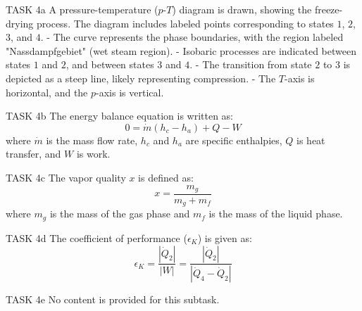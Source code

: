 TASK 4a  
A pressure-temperature (\(p\)-\(T\)) diagram is drawn, showing the freeze-drying process. The diagram includes labeled points corresponding to states \(1\), \(2\), \(3\), and \(4\).  
- The curve represents the phase boundaries, with the region labeled "Nassdampfgebiet" (wet steam region).  
- Isobaric processes are indicated between states \(1\) and \(2\), and between states \(3\) and \(4\).  
- The transition from state \(2\) to \(3\) is depicted as a steep line, likely representing compression.  
- The \(T\)-axis is horizontal, and the \(p\)-axis is vertical.  

TASK 4b  
The energy balance equation is written as:  
\[
0 = \dot{m} (h_c - h_a) + Q - W
\]  
where \( \dot{m} \) is the mass flow rate, \( h_c \) and \( h_a \) are specific enthalpies, \( Q \) is heat transfer, and \( W \) is work.  

TASK 4c  
The vapor quality \(x\) is defined as:  
\[
x = \frac{m_g}{m_g + m_f}
\]  
where \( m_g \) is the mass of the gas phase and \( m_f \) is the mass of the liquid phase.  

TASK 4d  
The coefficient of performance (\( \epsilon_K \)) is given as:  
\[
\epsilon_K = \frac{| \dot{Q}_2 |}{| W |} = \frac{| \dot{Q}_2 |}{| \dot{Q}_4 - \dot{Q}_2 |}
\]  

TASK 4e  
No content is provided for this subtask.